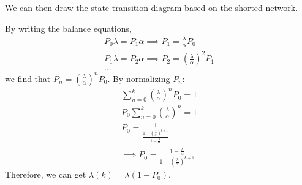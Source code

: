 \documentclass{article}
\begin{document}
\begin{enumerate}
			We can then draw the state transition diagram based on the shorted
			network.
			\vspace{40mm}
			
			By writing the balance equations,
			\begin{gather*}
				P_{0} \lambda = P_{1} \alpha \implies P_{1} = \frac{\lambda}{\alpha} P_{0} \\
				P_{1} \lambda = P_{2} \alpha \implies P_{2} = \left(\frac{\lambda}{\alpha}\right)^2 P_{1} \\
				\ldots
			\end{gather*}
			we find that $P_{n}=\left(\frac{\lambda}{\alpha}\right)^n P_{0}$.
			By normalizing $P_{n}$:
			\begin{gather*}
				\sum\limits_{n=0}^{k} \left(\frac{\lambda}{\alpha}\right)^n P_{0} = 1 \\
				P_{0} \sum\limits_{n=0}^{k} \left(\frac{\lambda}{\alpha}\right)^n = 1 \\
				P_{0} = \frac{1}{\frac{1-(\frac{\lambda}{\alpha})^{k+1}}{1-\frac{\lambda}{\alpha}}} \\
				\implies P_{0} = \frac{1-\frac{\lambda}{\alpha}}{1-(\frac{\lambda}{\alpha})^{k+1}}
			\end{gather*}
			Therefore, we can get $\lambda(k)=\lambda(1-P_{0})$.
	\end{enumerate}
\end{document}
